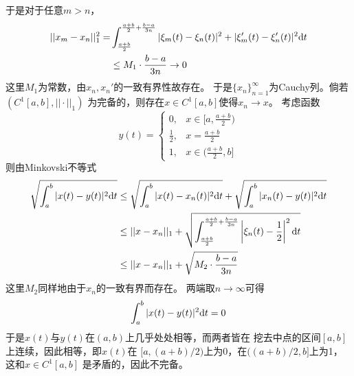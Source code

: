 \documentclass[cn]{homework}
\begin{document}
\begin{subproblem}
        于是对于任意$m>n$，
        \[\begin{aligned}
            ||x_m-x_n||_1^2=&\int_{\frac{a+b}{2}}^{\frac{a+b}{2}+\frac{b-a}{3n}}
            |\xi_m(t)-\xi_n(t)|^2+|\xi'_m(t)-\xi'_n(t)|^2\mathrm d t\\
            &\leq M_1\cdot\frac{b-a}{3n}\to 0
        \end{aligned}\]
        这里$M_1$为常数，由$x_n,x_n'$的一致有界性故存在。
        于是$\{x_n\}_{n=1}^\infty$为Cauchy列。倘若$(C^1[a,b],||\cdot||_1)$
        为完备的，则存在$x\in C^1[a,b]$使得$x_n\to x$。
        考虑函数
        \[y(t)=\begin{cases}
            0,&x\in[a,\frac{a+b}{2})\\
            \frac{1}{2},&x=\frac{a+b}{2}\\
            1,&x\in(\frac{a+b}{2},b]
        \end{cases}\]
        则由Minkovski不等式
        \[\begin{aligned}
        \sqrt{\int_a^b|x(t)-y(t)|^2\mathrm d t}
        &\leq\sqrt{\int_a^b|x(t)-x_n(t)|^2\mathrm d t}
        +\sqrt{\int_a^b|x_n(t)-y(t)|^2\mathrm d t}\\
        &\leq ||x-x_n||_1
            +\sqrt{\int_{\frac{a+b}{2}}^{\frac{a+b}{2}+\frac{b-a}{3n}}
                \left|\xi_n(t)-\frac{1}{2}\right|^2\mathrm d t}\\
        &\leq ||x-x_n||_1+\sqrt{M_2\cdot\frac{b-a}{3n}}
        \end{aligned}\]
        这里$M_2$同样地由于$x_n$的一致有界而存在。
        两端取$n\to\infty$可得
        \[\int_a^b|x(t)-y(t)|^2\mathrm d t=0\]
        于是$x(t)$与$y(t)$在$(a,b)$上几乎处处相等，而两者皆在
        挖去中点的区间$[a,b]$上连续，因此相等，即$x(t)$在
        $[a,(a+b)/2)$上为0，在$((a+b)/2,b]$上为1，这和$x\in C^1[a,b]$
        是矛盾的，因此不完备。
    \end{subproblem}
\end{document}
